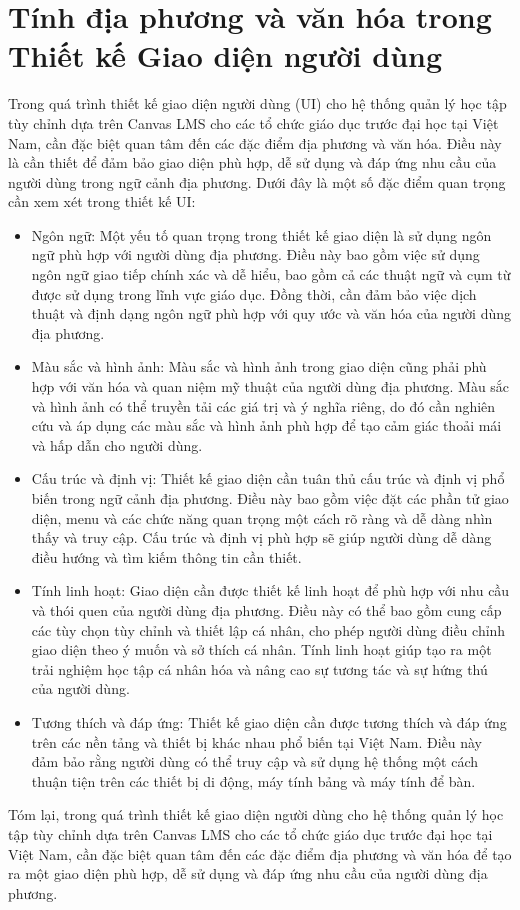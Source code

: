 \documentclass[../Thesis.tex]{subfiles}
\begin{document}
\section{Tính địa phương và văn hóa trong Thiết kế Giao diện người dùng}
Trong quá trình thiết kế giao diện người dùng (UI) cho hệ thống quản lý học tập tùy chỉnh dựa trên Canvas LMS cho các tổ chức giáo dục trước đại học tại Việt Nam, cần đặc biệt quan tâm đến các đặc điểm địa phương và văn hóa. Điều này là cần thiết để đảm bảo giao diện phù hợp, dễ sử dụng và đáp ứng nhu cầu của người dùng trong ngữ cảnh địa phương. Dưới đây là một số đặc điểm quan trọng cần xem xét trong thiết kế UI:

	\begin{itemize}[label=$\bullet$]
		\item Ngôn ngữ: Một yếu tố quan trọng trong thiết kế giao diện là sử dụng ngôn ngữ phù hợp với người dùng địa phương. Điều này bao gồm việc sử dụng ngôn ngữ giao tiếp chính xác và dễ hiểu, bao gồm cả các thuật ngữ và cụm từ được sử dụng trong lĩnh vực giáo dục. Đồng thời, cần đảm bảo việc dịch thuật và định dạng ngôn ngữ phù hợp với quy ước và văn hóa của người dùng địa phương.

		\item Màu sắc và hình ảnh: Màu sắc và hình ảnh trong giao diện cũng phải phù hợp với văn hóa và quan niệm mỹ thuật của người dùng địa phương. Màu sắc và hình ảnh có thể truyền tải các giá trị và ý nghĩa riêng, do đó cần nghiên cứu và áp dụng các màu sắc và hình ảnh phù hợp để tạo cảm giác thoải mái và hấp dẫn cho người dùng.

		\item Cấu trúc và định vị: Thiết kế giao diện cần tuân thủ cấu trúc và định vị phổ biến trong ngữ cảnh địa phương. Điều này bao gồm việc đặt các phần tử giao diện, menu và các chức năng quan trọng một cách rõ ràng và dễ dàng nhìn thấy và truy cập. Cấu trúc và định vị phù hợp sẽ giúp người dùng dễ dàng điều hướng và tìm kiếm thông tin cần thiết.

		\item Tính linh hoạt: Giao diện cần được thiết kế linh hoạt để phù hợp với nhu cầu và thói quen của người dùng địa phương. Điều này có thể bao gồm cung cấp các tùy chọn tùy chỉnh và thiết lập cá nhân, cho phép người dùng điều chỉnh giao diện theo ý muốn và sở thích cá nhân. Tính linh hoạt giúp tạo ra một trải nghiệm học tập cá nhân hóa và nâng cao sự tương tác và sự hứng thú của người dùng.

		\item Tương thích và đáp ứng: Thiết kế giao diện cần được tương thích và đáp ứng trên các nền tảng và thiết bị khác nhau phổ biến tại Việt Nam. Điều này đảm bảo rằng người dùng có thể truy cập và sử dụng hệ thống một cách thuận tiện trên các thiết bị di động, máy tính bảng và máy tính để bàn.
	\end{itemize}
	Tóm lại, trong quá trình thiết kế giao diện người dùng cho hệ thống quản lý học tập tùy chỉnh dựa trên Canvas LMS cho các tổ chức giáo dục trước đại học tại Việt Nam, cần đặc biệt quan tâm đến các đặc điểm địa phương và văn hóa để tạo ra một giao diện phù hợp, dễ sử dụng và đáp ứng nhu cầu của người dùng địa phương.
\end{document}
